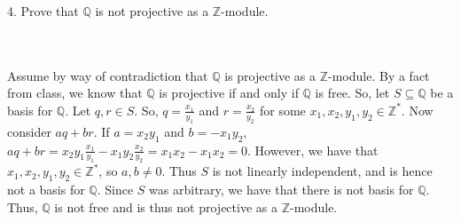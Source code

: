 4. Prove that $\mathbb{Q}$ is not projective as a $\mathbb{Z}$-module.\\\\

\begin{solution}\renewcommand{\qedsymbol}{}\ \\
    Assume by way of contradiction that $\mathbb{Q}$ is projective as a $\mathbb{Z}$-module. By a fact
    from class, we know that $\mathbb{Q}$ is projective if and only if $\mathbb{Q}$ is free. So, let
    $S\subseteq\mathbb{Q}$ be a basis for $\mathbb{Q}$. Let $q,r\in S$. So, $q=\frac{x_1}{y_1}$ and
    $r=\frac{x_2}{y_2}$ for some $x_1,x_2,y_1,y_2\in\mathbb{Z}^*$. Now consider $aq+br$. If $a=x_2y_1$
    and $b=-x_1y_2$, $aq+br=x_2y_1\frac{x_1}{y_1}-x_1y_2\frac{x_2}{y_2}=x_1x_2-x_1x_2=0$. However, we
    have that $x_1,x_2,y_1,y_2\in\mathbb{Z}^*$, so $a,b\neq0$. Thus $S$ is not linearly independent, and
    is hence not a basis for $\mathbb{Q}$. Since $S$ was arbitrary, we have that there is not basis for
    $\mathbb{Q}$. Thus, $\mathbb{Q}$ is not free and is thus not projective as a $\mathbb{Z}$-module.

\end{solution}
